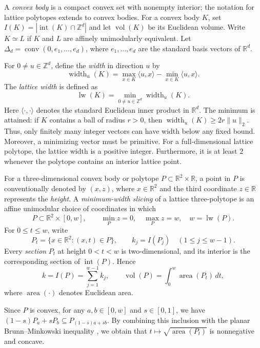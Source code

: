 \documentclass[reqno, 11pt]{article}
\numberwithin{equation}{section}
\theoremstyle{definition}
\newcommand{\R}{\mathbb R}
\newcommand{\Z}{\mathbb Z}
\DeclareMathOperator{\Int}{int}
\DeclareMathOperator{\vol}{vol}
\DeclareMathOperator{\area}{area}
\DeclareMathOperator{\lw}{lw}
\DeclareMathOperator{\conv}{conv}
\numberwithin{equation}{section}
\begin{document}
A \emph{convex body} is a compact convex set with nonempty interior; the notation for lattice polytopes extends to convex bodies. For a convex body $K$, set $I(K)=|\Int(K)\cap\Z^d|$ and let $\vol(K)$ be its Euclidean volume. Write $K\simeq L$ if $K$ and $L$ are affinely unimodularly equivalent. Let $\Delta_d=\conv(0,e_1,\dots,e_d)$, where \(e_1,\dots,e_d\) are the standard basis vectors of \(\mathbb R^d\).

For $0\ne u\in\Z^d$, define the \emph{width} in direction $u$ by
\[
\operatorname{width}_u(K)
=\max_{x\in K}\langle u,x\rangle-\min_{x\in K}\langle u,x\rangle.
\]
The \emph{lattice width} is defined as  
\[
\lw(K)=\min_{0\ne u\in\Z^d}\operatorname{width}_u(K).
\]
Here $\langle \cdot, \cdot \rangle$ denotes the standard Euclidean inner product in $\mathbb{R}^d$. The minimum is attained: if $K$ contains a ball of radius $r>0$, then $\operatorname{width}_u(K)\ge2r\|u\|_2$. Thus, only finitely many
integer vectors can have width below any fixed bound. Moreover, a minimizing vector must be primitive. For a full-dimensional lattice polytope, the lattice width is a positive integer. Furthermore, it is at least $2$ whenever the polytope contains an interior lattice point.

For a three-dimensional convex body or polytope $P \subset \mathbb{R}^2 \times \mathbb{R}$, a point in $P$ is conventionally denoted by $(x, z)$, where $x \in \mathbb{R}^2$ and the third coordinate $z \in \mathbb{R}$ represents the \emph{height}.
A \emph{minimum-width slicing} of a lattice three-polytope is an affine unimodular choice of coordinates in which
\begin{equation}\label{eq:normalization}
 P\subset\R^2\times[0,w],\qquad \min_P z=0,\quad\max_P z=w,\quad w=\lw(P).
\end{equation}
For $0\le t\le w$, write
\[ P_t=\{x\in\R^2:(x,t)\in P\},\qquad k_j=I(P_j)\quad(1\le j\le w-1).
\]
Every \emph{section} $P_t$ at height $0<t<w$ is two-dimensional, and its interior is the corresponding section of $\Int(P)$. Hence
\begin{equation}\label{eq:section-accounting}
 k=I(P)=\sum_{j=1}^{w-1}k_j,\qquad \vol(P)=\int_0^w\area(P_t)\,dt,
\end{equation}
where $\area(\cdot)$ denotes Euclidean area.


Since $P$ is convex, for any $a,b\in[0,w]$ and $s\in[0,1]$, we have $(1-s)P_a+sP_b\subseteq P_{(1-s)a+sb}$.
By combining this inclusion with the planar Brunn--Minkowski inequality \cite{Gardner2002}, we obtain that
$t\mapsto\sqrt{\area(P_t)}$ is nonnegative and concave.
\end{document}
